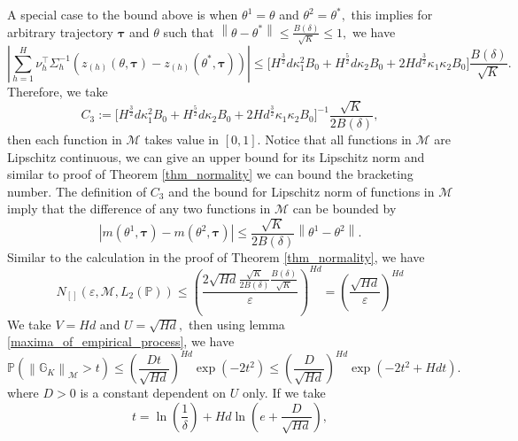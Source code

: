 \documentclass{article}
\numberwithin{equation}{section}
\theoremstyle{plain}
\theoremstyle{definition}
\theoremstyle{remark}
\begin{document}
A special case to the bound above is when $\theta^1 = \theta$ and $\theta^2 = \theta^*,$ this implies for arbitrary trajectory $\boldsymbol{\tau}$ and $\theta$ such that $\left\|\theta - \theta^*\right\| \leq \frac{B(\delta)}{\sqrt{K}} \leq 1,$ we have
\begin{equation*}
    \left| \sum_{h=1}^H \nu_h^{\top} \Sigma_h^{-1} \left(z_{(h)}\left(\theta, \boldsymbol{\tau}\right) - z_{(h)}\left(\theta^*, \boldsymbol{\tau}\right)\right) \right| \leq  \bigg[H^{\frac{3}{2}} d \kappa_1^2 B_0 + H^{\frac{5}{2}} d \kappa_2 B_0 + 2 H d^{\frac{3}{2}} \kappa_1 \kappa_2 B_0\bigg] \frac{B(\delta)}{\sqrt{K}}.
\end{equation*}
Therefore, we take
\begin{equation*}
    C_3 := \bigg[H^{\frac{3}{2}} d \kappa_1^2 B_0 + H^{\frac{5}{2}} d \kappa_2 B_0 + 2 H d^{\frac{3}{2}} \kappa_1 \kappa_2 B_0\bigg]^{-1} \frac{\sqrt{K}}{2 B(\delta)},
\end{equation*}
then each function in $\mathcal{M}$ takes value in $[0,1].$ Notice that all functions in $\mathcal{M}$ are Lipschitz continuous, we can give an upper bound for its Lipschitz norm and similar to proof of Theorem \ref{thm_normality} we can bound the bracketing number. The definition of $C_3$ and the bound for Lipschitz norm of functions in $\mathcal{M}$ imply that the difference of any two functions in $\mathcal{M}$ can be bounded by
\begin{equation*}
    \left|m(\theta^1,\boldsymbol{\tau}) - m(\theta^2,\boldsymbol{\tau})\right| \leq \frac{\sqrt{K}}{2 B(\delta)} \left\|\theta^1-\theta^2\right\|.
\end{equation*}
Similar to the calculation in the proof of Theorem \ref{thm_normality}, we have
\begin{equation*}
    N_{[]}\left(\varepsilon,\mathcal{M},L_2(\mathbb{P})\right)
    \leq \left(\frac{2\sqrt{Hd} \frac{\sqrt{K}}{2 B(\delta)} \frac{B(\delta)}{\sqrt{K}}}{\varepsilon}\right)^{Hd} = \left(\frac{\sqrt{Hd}}{\varepsilon}\right)^{Hd}
\end{equation*}
We take $V = Hd$ and $U = \sqrt{Hd},$ then using lemma \ref{maxima_of_empirical_process}, we have
\begin{equation*}
    \mathbb{P}\left(\left\|\mathbb{G}_K\right\|_{\mathcal{M}} > t\right) \leq \left(\frac{Dt}{\sqrt{Hd}}\right)^{Hd} \exp(-2t^2) \leq \left(\frac{D}{\sqrt{Hd}}\right)^{Hd} \exp(-2t^2 + Hd t).
\end{equation*}
where $D > 0$ is a constant dependent on $U$ only. If we take
\begin{equation*}
    t = \ln\left(\frac{1}{\delta}\right) + Hd \ln\left(e + \frac{D}{\sqrt{Hd}}\right),
\end{equation*}
\end{document}
